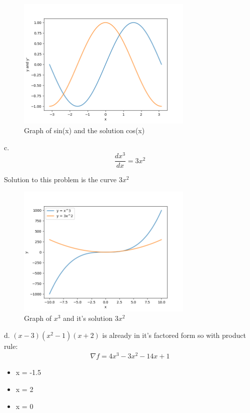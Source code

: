 \begin{figure}[htbp]
  \centerline{\includegraphics[width=0.75\textwidth]{images/gradient_ex2.png}}
  \caption{Graph of sin(x) and the solution cos(x)}
  \label{fig:gradient_ex2}
\end{figure}

c. 
\begin{equation}
  \frac{d x^3}{d x} = 3x^2 
\end{equation}

Solution to this problem is the curve $3x^2$
\begin{figure}[htbp]
  \centerline{\includegraphics[width=0.75\textwidth]{images/gradient_ex3.png}}
  \caption{Graph of $x^3$ and it's solution $3x^2$}
  \label{fig:gradient_ex3}
\end{figure}

d. 
$(x-3)(x^2-1)(x+2)$ is already in it's factored form so with product rule:
\begin{gather}
  \nabla f = 4x^3 - 3x^2 - 14x + 1
\end{gather}
\begin{itemize}
  \item x = -1.5
  \item x = 2
  \item x = 0
\end{itemize}  

